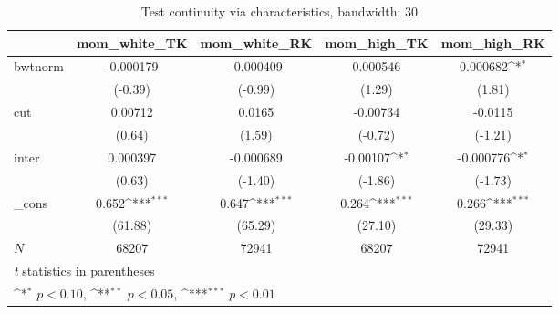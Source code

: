 \begin{table}[htbp]\centering
\def\sym#1{\ifmmode^{#1}\else\(^{#1}\)\fi}
\caption{Test continuity via characteristics, bandwidth: 30}
\begin{tabular}{l*{4}{c}}
\hline\hline
            &\multicolumn{1}{c}{mom\_white\_TK}&\multicolumn{1}{c}{mom\_white\_RK}&\multicolumn{1}{c}{mom\_high\_TK}&\multicolumn{1}{c}{mom\_high\_RK}\\
\hline
bwtnorm     &   -0.000179         &   -0.000409         &    0.000546         &    0.000682\sym{*}  \\
            &     (-0.39)         &     (-0.99)         &      (1.29)         &      (1.81)         \\
[1em]
cut         &     0.00712         &      0.0165         &    -0.00734         &     -0.0115         \\
            &      (0.64)         &      (1.59)         &     (-0.72)         &     (-1.21)         \\
[1em]
inter       &    0.000397         &   -0.000689         &    -0.00107\sym{*}  &   -0.000776\sym{*}  \\
            &      (0.63)         &     (-1.40)         &     (-1.86)         &     (-1.73)         \\
[1em]
\_cons      &       0.652\sym{***}&       0.647\sym{***}&       0.264\sym{***}&       0.266\sym{***}\\
            &     (61.88)         &     (65.29)         &     (27.10)         &     (29.33)         \\
\hline
\(N\)       &       68207         &       72941         &       68207         &       72941         \\
\hline\hline
\multicolumn{5}{l}{\footnotesize \textit{t} statistics in parentheses}\\
\multicolumn{5}{l}{\footnotesize \sym{*} \(p<0.10\), \sym{**} \(p<0.05\), \sym{***} \(p<0.01\)}\\
\end{tabular}
\end{table}
